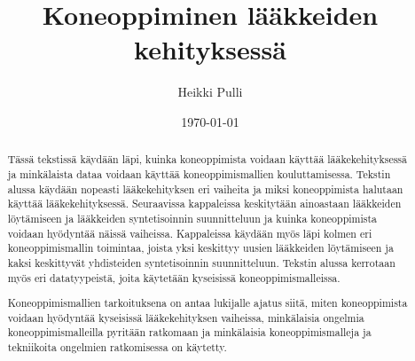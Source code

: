 \documentclass[finnish,twoside,censored,tkt,sw-line]{HYthesisML}
\title{Koneoppiminen lääkkeiden kehityksessä}
\author{Heikki Pulli}
\date{\today}
\begin{document}
\maketitle



\begin{abstract}

    Tässä tekstissä käydään läpi, kuinka koneoppimista voidaan käyttää lääkekehityksessä ja minkälaista dataa voidaan käyttää koneoppimismallien kouluttamisessa.
    Tekstin alussa käydään nopeasti lääkekehityksen eri vaiheita ja miksi koneoppimista halutaan käyttää lääkekehityksessä.
    Seuraavissa kappaleissa keskitytään ainoastaan lääkkeiden löytämiseen ja lääkkeiden syntetisoinnin suunnitteluun ja kuinka koneoppimista voidaan hyödyntää näissä vaiheissa.
    Kappaleissa käydään myös läpi kolmen eri koneoppimismallin toimintaa, joista yksi keskittyy uusien lääkkeiden löytämiseen ja kaksi keskittyvät yhdisteiden syntetisoinnin suunnitteluun.
    Tekstin alussa kerrotaan myös eri datatyypeistä, joita käytetään kyseisissä koneoppimismalleissa.

    Koneoppimismallien tarkoituksena on antaa lukijalle ajatus siitä, miten koneoppimista voidaan hyödyntää kyseisissä lääkekehityksen vaiheissa, minkälaisia ongelmia koneoppimismalleilla pyritään ratkomaan ja minkälaisia koneoppimismalleja ja tekniikoita ongelmien ratkomisessa on käytetty.


\end{abstract}


\end{document}

